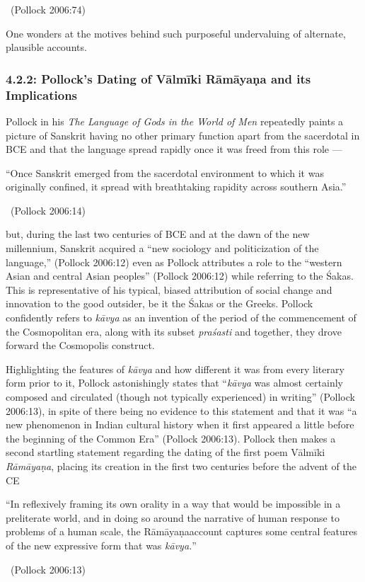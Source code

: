 ~\hfill (Pollock 2006:74)

One wonders at the motives behind such purposeful undervaluing of alternate, plausible accounts.


\subsubsection*{4.2.2: Pollock’s Dating of Vālmīki Rāmāyaṇa and its Implications}

Pollock in his \textit{The Language of Gods in the World of Men} repeatedly paints a picture of Sanskrit having no other primary function apart from the sacerdotal in BCE and that the language spread rapidly once it was freed from this role —

\begin{myquote}
“Once Sanskrit emerged from the sacerdotal environment to which it was originally confined, it spread with breathtaking rapidity across southern Asia.” 

~\hfill (Pollock 2006:14)
\end{myquote}

but, during the last two centuries of BCE and at the dawn of the new millennium, Sanskrit acquired a “new sociology and politicization of the language,” (Pollock 2006:12) even as Pollock attributes a role to the “western Asian and central Asian peoples” (Pollock 2006:12) while referring to the Śakas. This is representative of his typical, biased attribution of social change and innovation to the good outsider, be it the Śakas or the Greeks. Pollock confidently refers to \textit{kāvya} as an invention of the period of the commencement of the Cosmopolitan era, along with its subset \textit{praśasti} and together, they drove forward the Cosmopolis construct.

Highlighting the features of \textit{kāvya} and how different it was from every literary form prior to it, Pollock astonishingly states that “\textit{kāvya} was almost certainly composed and circulated (though not typically experienced) in writing” (Pollock 2006:13), in spite of there being no evidence to this statement and that it was “a new phenomenon in Indian cultural history when it first appeared a little before the beginning of the Common Era” (Pollock 2006:13). Pollock then makes a second startling statement regarding the dating of the first poem Vālmīki \textit{Rāmāyaṇa}, placing its creation in the first two centuries before the advent of the CE

\begin{myquote}
“In reflexively framing its own orality in a way that would be impossible in a preliterate world, and in doing so around the narrative of human response to problems of a human scale, the Rāmāyaṇaaccount captures some central features of the new expressive form that was \textit{kāvya.}” 

~\hfill (Pollock 2006:13)
\end{myquote}

